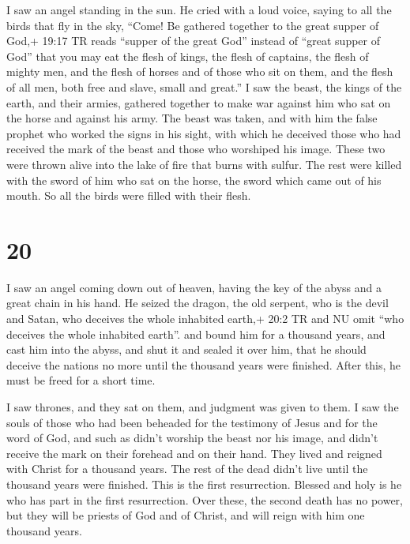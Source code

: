  I saw an angel standing in the sun. He cried with a loud
voice, saying to all the birds that fly in the sky, ``Come! Be gathered
together to the great supper of God,+ 19:17 TR reads ``supper of the
great God'' instead of ``great supper of God''  that you
may eat the flesh of kings, the flesh of captains, the flesh of mighty
men, and the flesh of horses and of those who sit on them, and the flesh
of all men, both free and slave, small and great.''  I saw
the beast, the kings of the earth, and their armies, gathered together
to make war against him who sat on the horse and against his army.
 The beast was taken, and with him the false prophet who
worked the signs in his sight, with which he deceived those who had
received the mark of the beast and those who worshiped his image. These
two were thrown alive into the lake of fire that burns with sulfur.
 The rest were killed with the sword of him who sat on the
horse, the sword which came out of his mouth. So all the birds were
filled with their flesh.

\hypertarget{section-19}{%
\section{20}\label{section-19}}

 I saw an angel coming down out of heaven, having the key of
the abyss and a great chain in his hand.  He seized the
dragon, the old serpent, who is the devil and Satan, who deceives the
whole inhabited earth,+ 20:2 TR and NU omit ``who deceives the whole
inhabited earth''. and bound him for a thousand years,  and
cast him into the abyss, and shut it and sealed it over him, that he
should deceive the nations no more until the thousand years were
finished. After this, he must be freed for a short time.

 I saw thrones, and they sat on them, and judgment was given
to them. I saw the souls of those who had been beheaded for the
testimony of Jesus and for the word of God, and such as didn't worship
the beast nor his image, and didn't receive the mark on their forehead
and on their hand. They lived and reigned with Christ for a thousand
years.  The rest of the dead didn't live until the thousand
years were finished. This is the first resurrection. 
Blessed and holy is he who has part in the first resurrection. Over
these, the second death has no power, but they will be priests of God
and of Christ, and will reign with him one thousand years.

